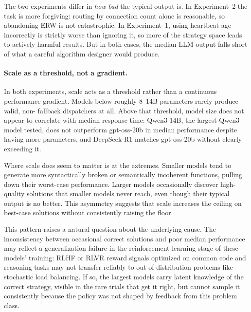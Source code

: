 \documentclass[11pt]{article}
\begin{document}
The two experiments differ in \emph{how bad} the typical output is.
In Experiment~2 the task is more forgiving: routing by connection
count alone is reasonable, so abandoning ERW is not catastrophic.
In Experiment~1, using heartbeat age incorrectly is strictly worse
than ignoring it, so more of the strategy space leads to actively
harmful results.
But in both cases, the median LLM output falls short of what a
careful algorithm designer would produce.

\paragraph{Scale as a threshold, not a gradient.}
In both experiments, scale acts as a threshold rather than a
continuous performance gradient.
Models below roughly 8--14B parameters rarely produce valid, non-
fallback dispatchers at all.
Above that threshold, model size does not appear to correlate with
median response time: Qwen3-14B, the largest Qwen3 model tested,
does not outperform gpt-oss-20b in median performance despite having
more parameters, and DeepSeek-R1 matches gpt-oss-20b without clearly
exceeding it.

Where scale does seem to matter is at the extremes.
Smaller models tend to generate more syntactically broken or
semantically incoherent functions, pulling down their worst-case
performance.
Larger models occasionally discover high-quality solutions that
smaller models never reach, even though their typical output is
no better.
This asymmetry suggests that scale increases the ceiling on best-case
solutions without consistently raising the floor.

This pattern raises a natural question about the underlying cause.
The inconsistency between occasional correct solutions and poor
median performance may reflect a generalization failure in the
reinforcement learning stage of these models' training: RLHF or
RLVR reward signals optimized on common code and reasoning tasks may
not transfer reliably to out-of-distribution problems like stochastic
load balancing.
If so, the largest models carry latent knowledge of the correct strategy,
visible in the rare trials that get it right, but cannot sample it
consistently because the policy was not shaped by feedback from
this problem class.
\end{document}

